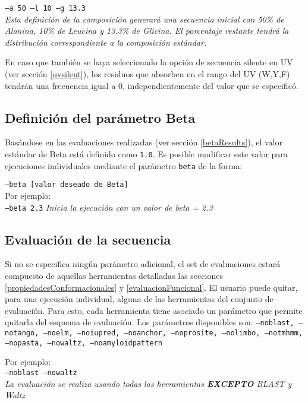 \indent \texttt{--a 50 --l 10 --g 13.3 } \\
\textit{Esta definición de la composición generará una secuencia inicial con 50\% de Alanina, 10\% de Leucina y 13.3\% de Glicina. 
El porcentaje restante tendrá la distribución correspondiente a la composición estándar.}



En caso que también se haya seleccionado la opción de secuencia silente en UV (ver sección \ref{uvsilent}), los residuos que absorben en el rango del UV (W,Y,F) tendrán una frecuencia igual a 0, independientemente del valor que se especificó.

\subsection{Definición del parámetro Beta}

Basándose en las evaluaciones realizadas (ver sección \ref{betaResults}), el valor estándar de Beta está definido como \texttt{1.0}. 
Es posible modificar este valor para ejecuciones individuales mediante el parámetro \texttt{beta} de la forma:

\indent \texttt{--beta [valor deseado de Beta]} 
\\Por ejemplo: \\
\indent \texttt{--beta 2.3} \hspace{0.5cm} \textit{Inicia la ejecución con un valor de beta = 2.3}



\subsection{Evaluación de la secuencia}\label{evaluacion}

Si no se especifica ningún parámetro adicional, el set de evaluaciones estará compuesto de aquellas herramientas detalladas las secciones \ref{propiedadesConformacionales} y \ref{evaluacionFuncional}.
El usuario puede quitar, para una ejecución individual, alguna de las herramientas del conjunto de evaluación. Para esto, cada herramienta tiene asociado un parámetro que permite quitarla del esquema de evaluación.
Los parámetros disponibles son: 
\texttt{--noblast, --notango, --noelm, --noiupred, --noanchor, --noprosite, 
--nolimbo, 
--notmhmm, 
--nopasta, 
--nowaltz, 
--noamyloidpattern}

\noindent Por ejemplo: \\
\indent \texttt{--noblast --nowaltz} \\%
\indent \indent \textit{La evaluación se realiza usando todas las herramientas \textbf{EXCEPTO} BLAST y Waltz}


